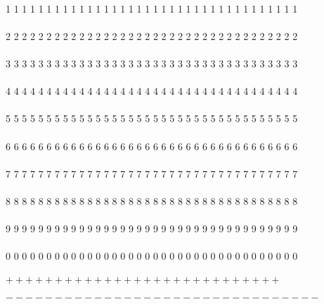 \documentclass{article}
\begin{document}
\hspace{2mm} \\
1 1 1 1 1 1 1 1 1 1 1 1 1 1 1 1 1 1 1 1 1 1 1 1 1 1 1 1 1 1 1 1 1 1 1 1 \\ \\
2 2 2 2 2 2 2 2 2 2 2 2 2 2 2 2 2 2 2 2 2 2 2 2 2 2 2 2 2 2 2 2 2 2 2 2 \\ \\
3 3 3 3 3 3 3 3 3 3 3 3 3 3 3 3 3 3 3 3 3 3 3 3 3 3 3 3 3 3 3 3 3 3 3 3 \\ \\
4 4 4 4 4 4 4 4 4 4 4 4 4 4 4 4 4 4 4 4 4 4 4 4 4 4 4 4 4 4 4 4 4 4 4 4 \\ \\
5 5 5 5 5 5 5 5 5 5 5 5 5 5 5 5 5 5 5 5 5 5 5 5 5 5 5 5 5 5 5 5 5 5 5 5 \\ \\
6 6 6 6 6 6 6 6 6 6 6 6 6 6 6 6 6 6 6 6 6 6 6 6 6 6 6 6 6 6 6 6 6 6 6 6 \\ \\
7 7 7 7 7 7 7 7 7 7 7 7 7 7 7 7 7 7 7 7 7 7 7 7 7 7 7 7 7 7 7 7 7 7 7 7 \\ \\
8 8 8 8 8 8 8 8 8 8 8 8 8 8 8 8 8 8 8 8 8 8 8 8 8 8 8 8 8 8 8 8 8 8 8 8 \\ \\
9 9 9 9 9 9 9 9 9 9 9 9 9 9 9 9 9 9 9 9 9 9 9 9 9 9 9 9 9 9 9 9 9 9 9 9 \\ \\
0 0 0 0 0 0 0 0 0 0 0 0 0 0 0 0 0 0 0 0 0 0 0 0 0 0 0 0 0 0 0 0 0 0 0 0 \\ \\
$+ + + + + + + + + + + + + + + + + + + + + + + + + + + + $ \\ \\
$ - - - - - - - - - - - - - - - - - - - - - - - - - - - - - - - - $
\end{document}
